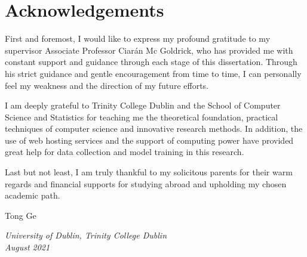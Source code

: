 \chapter{Acknowledgements}
{
\linespread{1.3}
\selectfont
First and foremost, I would like to express my profound gratitude to my supervisor Associate Professor Ciarán Mc Goldrick, who has provided me with constant support and guidance through each stage of this dissertation. Through his strict guidance and gentle encouragement from time to time, I can personally feel my weakness and the direction of my future efforts.

I am deeply grateful to Trinity College Dublin and the School of Computer Science and Statistics for teaching me the theoretical foundation, practical techniques of computer science and innovative research methods. In addition, the use of web hosting services and the support of computing power have provided great help for data collection and model training in this research.

Last but not least, I am truly thankful to my solicitous parents for their warm regards and financial supports for studying abroad and upholding my chosen academic path.

\vspace{1.2cm}
\begin{flushleft}
Tong Ge

\textit{University of Dublin, Trinity College Dublin \\
August 2021}
\end{flushleft}
}
\clearpage